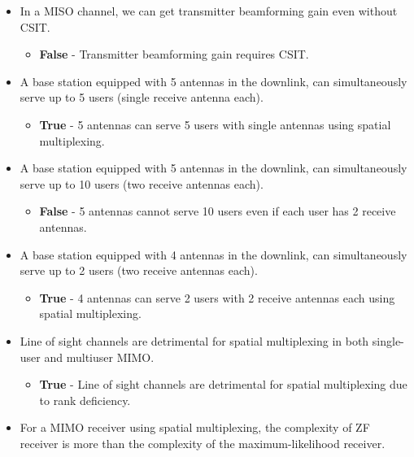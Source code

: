 \documentclass[11pt]{article}
\providecommand{\tightlist}{%
      \setlength{\itemsep}{0pt}\setlength{\parskip}{0pt}}
\begin{document}
\begin{itemize}
\item
  In a MISO channel, we can get transmitter beamforming gain even
  without CSIT.

  \begin{itemize}
  \tightlist
  \item
    \textbf{False} - Transmitter beamforming gain requires CSIT.
  \end{itemize}
\item
  A base station equipped with 5 antennas in the downlink, can
  simultaneously serve up to 5 users (single receive antenna each).

  \begin{itemize}
  \tightlist
  \item
    \textbf{True} - 5 antennas can serve 5 users with single antennas
    using spatial multiplexing.
  \end{itemize}
\item
  A base station equipped with 5 antennas in the downlink, can
  simultaneously serve up to 10 users (two receive antennas each).

  \begin{itemize}
  \tightlist
  \item
    \textbf{False} - 5 antennas cannot serve 10 users even if each user
    has 2 receive antennas.
  \end{itemize}
\item
  A base station equipped with 4 antennas in the downlink, can
  simultaneously serve up to 2 users (two receive antennas each).

  \begin{itemize}
  \tightlist
  \item
    \textbf{True} - 4 antennas can serve 2 users with 2 receive antennas
    each using spatial multiplexing.
  \end{itemize}
\item
  Line of sight channels are detrimental for spatial multiplexing in
  both single-user and multiuser MIMO.

  \begin{itemize}
  \tightlist
  \item
    \textbf{True} - Line of sight channels are detrimental for spatial
    multiplexing due to rank deficiency.
  \end{itemize}
\item
  For a MIMO receiver using spatial multiplexing, the complexity of ZF
  receiver is more than the complexity of the maximum-likelihood
  receiver.


\end{itemize}
\end{document}
